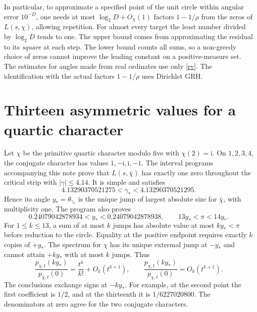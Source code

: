 \documentclass[11pt,letterpaper]{article}
\newcommand{\I}{\mathrm i}\newcommand{\e}{\mathrm e}
\theoremstyle{plain}
\theoremstyle{definition}\newtheorem{example}[theorem]{Example}
\begin{document}
In particular, to approximate a specified point of the unit circle within angular error $10^{-D}$, one needs at most $\log_2 D+O_\chi(1)$ factors $1-1/\rho$ from the zeros of $L(s,\chi)$, allowing repetition. For almost every target the least number divided by $\log_2 D$ tends to one. The upper bound comes from approximating the residual to its \emph{square} at each step. The lower bound counts all sums, so a non-greedy choice of zeros cannot improve the leading constant on a positive-measure set. The estimates for angles made from real ordinates use only \eqref{rv}. The identification with the actual factors $1-1/\rho$ uses Dirichlet GRH.

\section{Thirteen asymmetric values for a quartic character}\label{example}
Let $\chi$ be the primitive quartic character modulo five with $\chi(2)=\I$. On $1,2,3,4$, the conjugate character has values $1,-\I,\I,-1$. The interval programs accompanying this note prove that $L(s,\bar\chi)$ has exactly one zero throughout the critical strip with $|\gamma|\le4.14$. It is simple and satisfies
\[
    4.13290370521275 <\gamma_*<4.13290370521295 .
\]
Hence its angle $y_*=\theta_{\gamma_*}$ is the unique jump of largest absolute size for $\bar\chi$, with multiplicity one. The program also proves
\[
 0.24079042878934<y_*<0.24079042878938,\qquad 13y_*<\pi<14y_*.
\]
For $1\le k\le13$, a sum of at most $k$ jumps has absolute value at most $ky_*<\pi$ before reduction to the circle. Equality at the positive endpoint requires exactly $k$ copies of $+y_*$. The spectrum for $\chi$ has its unique extremal jump at $-y_*$ and cannot attain $+ky_*$ with at most $k$ jumps. Thus
\begin{equation}\label{quartic}
 \frac{p_{\bar\chi,t}(ky_*)}{p_{\bar\chi,t}(0)}
       =\frac{t^k}{k!}+O_k(t^{k+1}),\qquad
 \frac{p_{\chi,t}(ky_*)}{p_{\chi,t}(0)}=O_k(t^{k+1}).
\end{equation}
The conclusions exchange signs at $-ky_*$. For example, at the second point the first coefficient is $1/2$, and at the thirteenth it is $1/6227020800$. The denominators at zero agree for the two conjugate characters.
\end{document}

